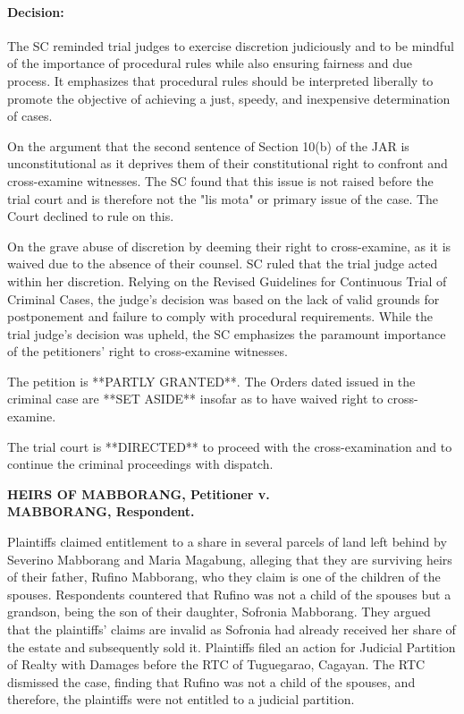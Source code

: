 \documentclass[
12pt,
oneside,
onehalfspacing,
headsepline
]{DigestCollection}
\begin{document}
\paragraph{Decision:}
\label{8005a050-1146-11ef-a21b-81e54ec76734}


The SC reminded trial judges to exercise discretion judiciously and to be mindful of the importance of procedural rules while also ensuring fairness and due process. It emphasizes that procedural rules should be interpreted liberally to promote the objective of achieving a just, speedy, and inexpensive determination of cases.

On the argument that the second sentence of Section 10(b) of the JAR is unconstitutional as it deprives them of their constitutional right to confront and cross-examine witnesses. The SC found that this issue is not raised before the trial court and is therefore not the "lis mota" or primary issue of the case. The Court declined to rule on this.

On the grave abuse of discretion by deeming their right to cross-examine, as it is waived due to the absence of their counsel. SC ruled that the trial judge acted within her discretion. Relying on the Revised Guidelines for Continuous Trial of Criminal Cases, the judge's decision was based on the lack of valid grounds for postponement and failure to comply with procedural requirements. While the trial judge's decision was upheld, the SC emphasizes the paramount importance of the petitioners' right to cross-examine witnesses.

The petition is **PARTLY GRANTED**. The Orders dated issued in the criminal case are **SET ASIDE** insofar as to have waived right to cross-examine.

The trial court is **DIRECTED** to proceed with the cross-examination and to continue the criminal proceedings with dispatch.

\label{7c3b93a0-0a2d-11ef-a1a5-03b0bde1fccf}


\noindent\textbf{HEIRS OF MABBORANG, Petitioner v. \\MABBORANG, Respondent. }\vspace{0.4cm}

Plaintiffs claimed entitlement to a share in several parcels of land left behind by Severino Mabborang and Maria Magabung, alleging that they are surviving heirs of their father, Rufino Mabborang, who they claim is one of the children of the spouses. Respondents countered that Rufino was not a child of the spouses but a grandson, being the son of their daughter, Sofronia Mabborang. They argued that the plaintiffs' claims are invalid as Sofronia had already received her share of the estate and subsequently sold it. Plaintiffs filed an action for Judicial Partition of Realty with Damages before the RTC of Tuguegarao, Cagayan. The RTC dismissed the case, finding that Rufino was not a child of the spouses, and therefore, the plaintiffs were not entitled to a judicial partition.
\end{document}
